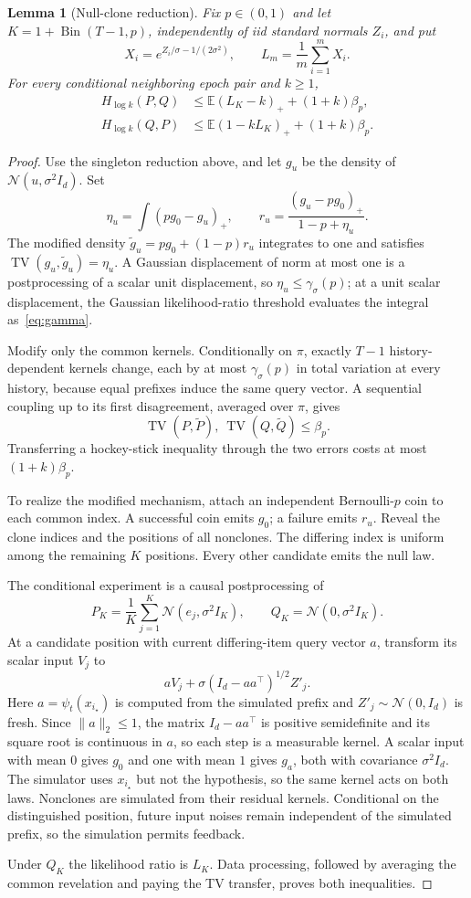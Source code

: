 \documentclass[conference]{IEEEtran}
\newtheorem{lemma}[theorem]{Lemma}
\newcommand{\E}{\mathbb E}
\newcommand{\N}{\mathcal N}
\newcommand{\TV}{\operatorname{TV}}
\newcommand{\Bin}{\operatorname{Bin}}
\begin{document}
\begin{lemma}[Null-clone reduction]\label{lem:clone}
Fix $p\in(0,1)$ and let $K=1+\Bin(T-1,p)$, independently of iid standard normals $Z_i$, and put
\[
 X_i=e^{Z_i/\sigma-1/(2\sigma^2)},\qquad
 L_m=\frac1m\sum_{i=1}^mX_i.
\]
For every conditional neighboring epoch pair and $k\ge1$,
\begin{align}
 H_{\log k}(P,Q)&\le\E(L_K-k)_++(1+k)\beta_p,\label{eq:clonef}\\
 H_{\log k}(Q,P)&\le\E(1-kL_K)_++(1+k)\beta_p.\label{eq:cloner}
\end{align}
\end{lemma}
\begin{proof}
Use the singleton reduction above, and let $g_u$ be the density of $\N(u,\sigma^2I_d)$. Set
\[
 \eta_u=\int(pg_0-g_u)_+,\qquad
 r_u=\frac{(g_u-pg_0)_+}{1-p+\eta_u}.
\]
The modified density $\widetilde g_u=pg_0+(1-p)r_u$ integrates to one and satisfies $\TV(g_u,\widetilde g_u)=\eta_u$. A Gaussian displacement of norm at most one is a postprocessing of a scalar unit displacement, so $\eta_u\le\gamma_\sigma(p)$; at a unit scalar displacement, the Gaussian likelihood-ratio threshold evaluates the integral as~\eqref{eq:gamma}.

Modify only the common kernels. Conditionally on $\pi$, exactly $T-1$ history-dependent kernels change, each by at most $\gamma_\sigma(p)$ in total variation at every history, because equal prefixes induce the same query vector. A sequential coupling up to its first disagreement, averaged over $\pi$, gives
\[
 \TV(P,\widetilde P),\ \TV(Q,\widetilde Q)\le\beta_p.
\] Transferring a hockey-stick inequality through the two errors costs at most $(1+k)\beta_p$.

To realize the modified mechanism, attach an independent Bernoulli-$p$ coin to each common index. A successful coin emits $g_0$; a failure emits $r_u$. Reveal the clone indices and the positions of all nonclones. The differing index is uniform among the remaining $K$ positions. Every other candidate emits the null law.

The conditional experiment is a causal postprocessing of
\[
 P_K=\frac1K\sum_{j=1}^K\N(e_j,\sigma^2I_K),\qquad
 Q_K=\N(0,\sigma^2I_K).
\]
At a candidate position with current differing-item query vector $a$, transform its scalar input $V_j$ to
\[
 aV_j+\sigma(I_d-aa^\top)^{1/2}Z'_j.
\]
Here $a=\psi_t(x_{i_\star})$ is computed from the simulated prefix and $Z'_j\sim\N(0,I_d)$ is fresh. Since $\|a\|_2\le1$, the matrix $I_d-aa^\top$ is positive semidefinite and its square root is continuous in $a$, so each step is a measurable kernel. A scalar input with mean $0$ gives $g_0$ and one with mean $1$ gives $g_a$, both with covariance $\sigma^2I_d$. The simulator uses $x_{i_\star}$ but not the hypothesis, so the same kernel acts on both laws. Nonclones are simulated from their residual kernels. Conditional on the distinguished position, future input noises remain independent of the simulated prefix, so the simulation permits feedback.

Under $Q_K$ the likelihood ratio is $L_K$. Data processing, followed by averaging the common revelation and paying the TV transfer, proves both inequalities.
\end{proof}
\end{document}
